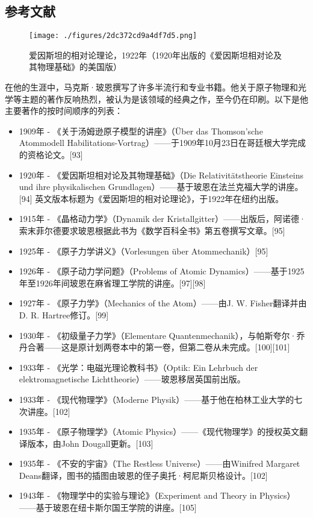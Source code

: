 \subsection{参考文献}
\begin{figure}[ht]
\centering
\texttt{[image: ./figures/2dc372cd9a4df7d5.png]}
\caption{爱因斯坦的相对论理论，1922年（1920年出版的《爱因斯坦相对论及其物理基础》的美国版）} \label{fig_BE_2}
\end{figure}
在他的生涯中，马克斯·玻恩撰写了许多半流行和专业书籍。他关于原子物理和光学等主题的著作反响热烈，被认为是该领域的经典之作，至今仍在印刷。以下是他主要著作的按时间顺序的列表：
\begin{itemize}
\item 1909年 - 《关于汤姆逊原子模型的讲座》（Über das Thomson'sche Atommodell Habilitations-Vortrag）——于1909年10月23日在哥廷根大学完成的资格论文。[93]  
\item 1920年 - 《爱因斯坦相对论及其物理基础》（Die Relativitätstheorie Einsteins und ihre physikalischen Grundlagen）——基于玻恩在法兰克福大学的讲座。[94] 英文版本标题为《爱因斯坦的相对论理论》，于1922年在纽约出版。  
\item 1915年 - 《晶格动力学》（Dynamik der Kristallgitter）——出版后，阿诺德·索末菲尔德要求玻恩根据此书为《数学百科全书》第五卷撰写文章。[95]  
\item 1925年 - 《原子力学讲义》（Vorlesungen über Atommechanik）[95]  
\item 1926年 - 《原子动力学问题》（Problems of Atomic Dynamics）——基于1925年至1926年间玻恩在麻省理工学院的讲座。[97][98]  
\item 1927年 - 《原子力学》（Mechanics of the Atom）——由J. W. Fisher翻译并由D. R. Hartree修订。[99]  
\item 1930年 - 《初级量子力学》（Elementare Quantenmechanik），与帕斯夸尔·乔丹合著——这是原计划两卷本中的第一卷，但第二卷从未完成。[100][101]  
\item 1933年 - 《光学：电磁光理论教科书》（Optik: Ein Lehrbuch der elektromagnetische Lichttheorie）——玻恩移居英国前出版。  
\item 1933年 - 《现代物理学》（Moderne Physik）——基于他在柏林工业大学的七次讲座。[102]  
\item 1935年 - 《原子物理学》（Atomic Physics）——《现代物理学》的授权英文翻译版本，由John Dougall更新。[103]  
\item 1935年 - 《不安的宇宙》（The Restless Universe）——由Winifred Margaret Deans翻译，图书的插图由玻恩的侄子奥托·柯尼斯贝格设计。[102]  
\item 1943年 - 《物理学中的实验与理论》（Experiment and Theory in Physics）——基于玻恩在纽卡斯尔国王学院的讲座。[105]  

\end{itemize}
